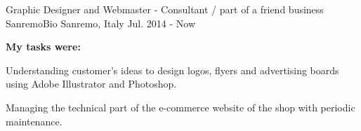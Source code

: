 {\begin{cventries}
  \cventry
  {Graphic Designer and Webmaster - Consultant / part of a friend business} %
  {SanremoBio} %
  {Sanremo, Italy} %
  {Jul. 2014 - Now} %
  {
    \begin{cvparagraph}
      \textbf{My tasks were:}
    \end{cvparagraph}
    \begin{cvitems} %
      \item {Understanding customer's ideas to design logos, flyers and advertising boards using Adobe Illustrator and Photoshop.}
      \item {Managing the technical part of the e-commerce website of the shop with periodic maintenance.}
    \end{cvitems}
  }{}
\end{cventries}
}